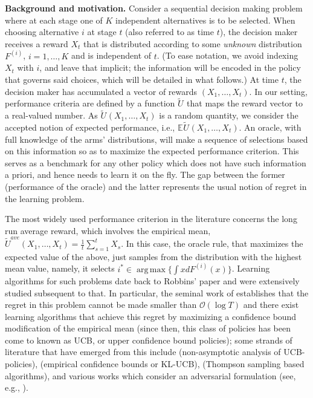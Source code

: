 \documentclass[final,12pt]{colt2018}
\newcommand{\prn}[1]{\left( #1 \right)}
\newcommand{\EE}[2][]{\mathbb{E}_{#1}{#2}}
\DeclareMathOperator*{\argmax}{arg\,max}
\newcommand{\Rbase}[1][]{\tilde{U}^{#1}}
\newcommand{\Fi}[1][i]{F^{\prn{{#1}}}}
\begin{document}
	\textbf{Background and motivation.} Consider a sequential decision making problem where at each stage  one of  $K$ independent alternatives is to be selected. When choosing alternative $i$ at stage $t$ (also referred to as time $t$), the decision maker receives a reward $X_t$ that is distributed according to some \emph{unknown} distribution $\Fi$, $i=1,\ldots,K$ and is independent of $t$. (To ease notation, we avoid indexing $X_t$ with $i$, and leave that implicit; the information will be encoded in the policy that governs said choices, which will be detailed in what follows.) At time $t$, the decision maker has accumulated a vector of rewards $(X_1,\ldots,X_t)$. In our setting, performance criteria are defined by a function $\Rbase$ that maps the reward vector to a real-valued number. As $\Rbase(X_1,\ldots,X_t)$ is a random quantity, we consider the accepted notion of expected performance, i.e., $\EE{\Rbase(X_1,\ldots,X_t)}$.  An oracle, with full knowledge of the arms' distributions, will make a sequence of selections based on this information so as to maximize the expected performance criterion. This serves as a benchmark for any other policy which does not have such information a priori, and hence needs to learn it on the fly. The gap between the former (performance of the oracle) and the latter represents the usual notion of regret in the learning problem.   
	
	The most widely used performance criterion in the literature concerns the long run average reward, which involves the empirical mean, $\Rbase[ave](X_1, \ldots, X_t) = \frac{1}{t}\sum_{s=1}^{t}X_s$. In this case, the oracle rule, that maximizes the expected value of the above, just samples from the distribution with the highest mean value, namely, it selects $i^* \in \argmax \{\int x d\Fi(x)\}$. Learning algorithms for such problems date back to Robbins' paper \cite{robbins1952some} and were extensively studied subsequent to that. In particular, the seminal work of \cite{lai1985asymptotically} establishes that the regret in this problem cannot be made smaller than $\mathcal{O}(\log T)$ and there exist learning algorithms that achieve this regret by maximizing a confidence bound modification of the empirical mean (since then, this class of policies has been come to known as UCB, or upper confidence bound policies); some strands of literature that have emerged from this include \cite{auer2002finite} (non-asymptotic analysis of  UCB-policies), \cite{maillard2011finite} (empirical confidence bounds or KL-UCB), \cite{agrawal2012analysis} (Thompson sampling based algorithms), and various works which consider an adversarial formulation (see, e.g., \cite{auer1995gambling}).
	
\end{document}
